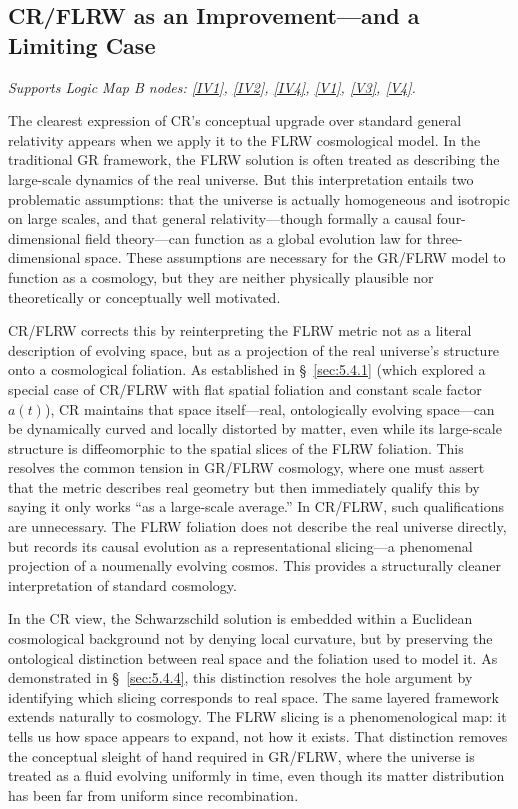 \documentclass[12pt]{book}
\begin{document}
\subsection{CR/FLRW as an Improvement---and a Limiting Case}\label{sec:5.4.5}
\noindent\textit{Supports Logic Map B nodes: \hyperref[appendix:IV1]{[IV1]}, \hyperref[appendix:IV2]{[IV2]}, \hyperref[appendix:IV4]{[IV4]}, \hyperref[appendix:V1]{[V1]}, \hyperref[appendix:V3]{[V3]}, \hyperref[appendix:V4]{[V4]}.}

\vspace{4pt}

The clearest expression of CR's conceptual upgrade over standard general relativity appears when we apply it to the FLRW cosmological model. In the traditional GR framework, the FLRW solution is often treated as describing the large-scale dynamics of the real universe. But this interpretation entails two problematic assumptions: that the universe is actually homogeneous and isotropic on large scales, and that general relativity---though formally a causal four-dimensional field theory---can function as a global evolution law for three-dimensional space. These assumptions are necessary for the GR/FLRW model to function as a cosmology, but they are neither physically plausible nor theoretically or conceptually well motivated.

CR/FLRW corrects this by reinterpreting the FLRW metric not as a literal description of evolving space, but as a projection of the real universe's structure onto a cosmological foliation. As established in \S~\ref{sec:5.4.1} (which explored a special case of CR/FLRW with flat spatial foliation and constant scale factor $a(t)$), CR maintains that space itself---real, ontologically evolving space---can be dynamically curved and locally distorted by matter, even while its large-scale structure is diffeomorphic to the spatial slices of the FLRW foliation. This resolves the common tension in GR/FLRW cosmology, where one must assert that the metric describes real geometry but then immediately qualify this by saying it only works ``as a large-scale average.'' In CR/FLRW, such qualifications are unnecessary. The FLRW foliation does not describe the real universe directly, but records its causal evolution as a representational slicing---a phenomenal projection of a noumenally evolving cosmos. This provides a structurally cleaner interpretation of standard cosmology. 

In the CR view, the Schwarzschild solution is embedded within a Euclidean cosmological background not by denying local curvature, but by preserving the ontological distinction between real space and the foliation used to model it. As demonstrated in \S~\ref{sec:5.4.4}, this distinction resolves the hole argument by identifying which slicing corresponds to real space. The same layered framework extends naturally to cosmology. The FLRW slicing is a phenomenological map: it tells us how space appears to expand, not how it exists. That distinction removes the conceptual sleight of hand required in GR/FLRW, where the universe is treated as a fluid evolving uniformly in time, even though its matter distribution has been far from uniform since recombination.
\end{document}
